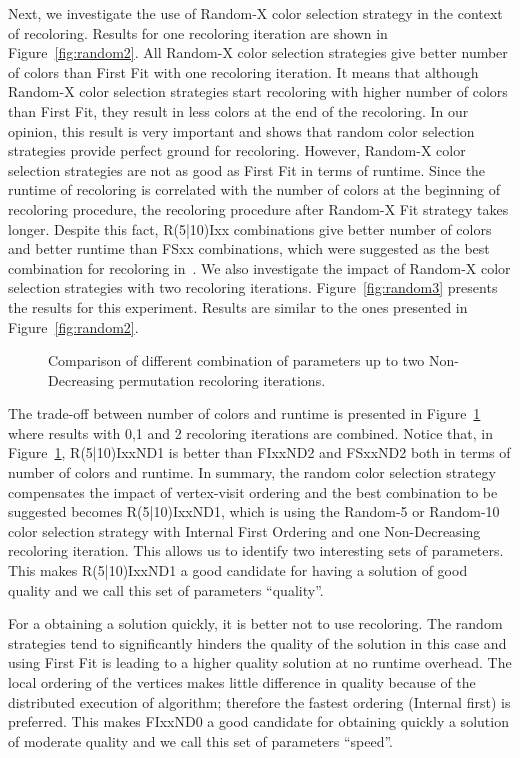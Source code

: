 \documentclass{article}
\begin{document}
Next, we investigate the use of Random-X color selection strategy
in the context of recoloring. Results for one recoloring iteration
are shown in Figure~\ref{fig:random2}.  All
Random-X color selection strategies give better number of colors than
First Fit with one recoloring iteration. It means that although
Random-X color selection strategies start recoloring with higher
number of colors than First Fit, they result in less colors at the end
of the recoloring. In our opinion, this result is very important and
shows that random color selection strategies provide perfect ground
for recoloring.  However, Random-X color selection strategies are not
as good as First Fit in terms of runtime. Since the runtime of
recoloring is correlated with the number of colors at the beginning of
recoloring procedure, the recoloring procedure after Random-X Fit
strategy takes longer. Despite this fact, R(5|10)Ixx combinations give
better number of colors and better runtime than FSxx combinations,
which were suggested as the best combination for recoloring
in~\cite{HiPC11}. We also investigate the impact of Random-X color selection
strategies with two recoloring iterations. Figure~\ref{fig:random3}
presents the results for this experiment.  Results are similar to the
ones presented in Figure~\ref{fig:random2}.

\begin{figure}[tb]
  \centering
  \caption{Comparison of different combination of parameters up to two Non-Decreasing permutation recoloring iterations.}
  \label{fig:bigpicture}
\end{figure}

The trade-off between number of colors and runtime is presented in
Figure~\ref{fig:bigpicture} where results with 0,1 and 2 recoloring
iterations are combined. Notice that, in Figure~\ref{fig:bigpicture},
R(5|10)IxxND1 is better than FIxxND2 and FSxxND2 both in terms of
number of colors and runtime.  In summary, the random color selection
strategy compensates the impact of vertex-visit ordering and the best
combination to be suggested becomes R(5|10)IxxND1, which is using the
Random-5 or Random-10 color selection strategy with Internal First
Ordering and one Non-Decreasing recoloring iteration. This allows us
to identify two interesting sets of parameters. This makes
R(5|10)IxxND1 a good candidate for having a solution of good quality
and we call this set of parameters ``quality''.

For a obtaining a solution quickly, it is better not to use
recoloring. The random strategies tend to significantly hinders the
quality of the solution in this case and using First Fit is leading to
a higher quality solution at no runtime overhead. The local ordering
of the vertices makes little difference in quality because of the
distributed execution of algorithm; therefore the fastest ordering
(Internal first) is preferred. This makes FIxxND0 a good candidate for
obtaining quickly a solution of moderate quality and we call this set
of parameters ``speed''.
\end{document}
